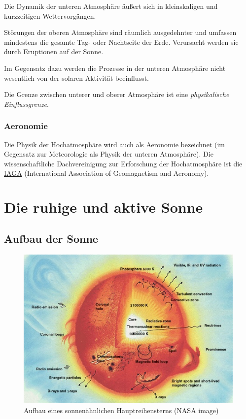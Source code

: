 \documentclass[
  a4paper,
  DIV=11]{scrreprt}
\begin{document}
Die Dynamik der unteren Atmosphäre äußert sich in kleinskaligen und
kurzzeitigen Wettervorgängen.

Störungen der oberen Atmosphäre sind räumlich ausgedehnter und umfassen
mindestens die gesamte Tag- oder Nachtseite der Erde. Verursacht werden
sie durch Eruptionen auf der Sonne.

Im Gegensatz dazu werden die Prozesse in der unteren Atmosphäre nicht
wesentlich von der solaren Aktivität beeinflusst.

Die Grenze zwischen unterer und oberer Atmosphäre ist eine
\emph{physikalische Einflussgrenze}.

\hypertarget{aeronomie}{%
\section{Aeronomie}\label{aeronomie}}

Die Physik der Hochatmosphäre wird auch als Aeronomie bezeichnet (im
Gegensatz zur Meteorologie als Physik der unteren Atmosphäre). Die
wissenschaftliche Dachvereinigung zur Erforschung der Hochatmosphäre ist
die \href{https://www.iaga-aiga.org/}{IAGA} (International Association
of Geomagnetism and Aeronomy).

\part{Die ruhige und aktive Sonne}

\hypertarget{aufbau-der-sonne}{%
\chapter{Aufbau der Sonne}\label{aufbau-der-sonne}}

\begin{figure}

{\centering \includegraphics{./images/paste-7BD74E6D.png}

}

\caption{\label{fig-aufbau-hauptreihenstern}Aufbau eines sonnenähnlichen
Hauptreihensterns (NASA image)}

\end{figure}
\end{document}
